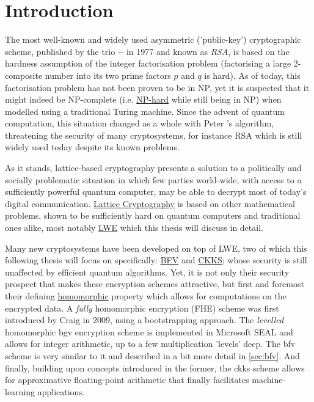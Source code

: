 \chapter{Introduction}
\label{chap:introduction}
The most well-known and widely used asymmetric ('public-key') cryptographic scheme, published by the trio -- in 1977 and known as \textit{RSA}, is based on the hardness assumption of the integer factorisation problem (factorising a large 2-composite number into its two prime factors $p$ and $q$ is hard).
As of today, this factorisation problem has not been proven to be in NP, yet it is suspected that it might indeed be NP-complete (i.e. \hyperref[def:np-hard]{NP-hard} while still being in NP) when modelled using a traditional Turing machine.
Since the advent of quantum computation, this situation changed as a whole with Peter 's algorithm, threatening the security of many cryptosystems, for instance RSA which is still widely used today despite its known problems.

As it stands, lattice-based cryptography presents a solution to a politically and socially problematic situation in which few parties world-wide, with access to a sufficiently powerful quantum computer, may be able to decrypt most of today's digital communication.
\hyperref[subsec:lattice-crypto]{Lattice Cryptography} is based on other mathematical problems, shown to be sufficiently hard on quantum computers and traditional ones alike, most notably \hyperref[def:lwe-search-problem]{LWE} which this thesis will discuss in detail.

Many new cryptosystems have been developed on top of LWE, two of which this following thesis will focus on specifically: \hyperref[def:bfv-scheme]{BFV} and \hyperref[def:ckks-scheme]{CKKS};
whose security is still unaffected by efficient quantum algorithms.
Yet, it is not only their security prospect that makes these encryption schemes attractive, but first and foremost their defining \hyperref[def:ring-homomorphism]{homomorphic} property which allows for computations on the encrypted data.
A \textit{fully} homomorphic encryption (FHE) scheme was first introduced by Craig  in 2009, using a bootstrapping approach.
The \textit{levelled} homomorphic \gls{bgv} encryption scheme is implemented in Microsoft SEAL and allows for integer arithmetic, up to a few multiplication 'levels' deep.
The \gls{bfv} scheme is very similar to it and described in a bit more detail in \autoref{sec:bfv}.
And finally, building upon concepts introduced in the former, the \gls{ckks} scheme allows for approximative floating-point arithmetic that finally facilitates machine-learning applications.

